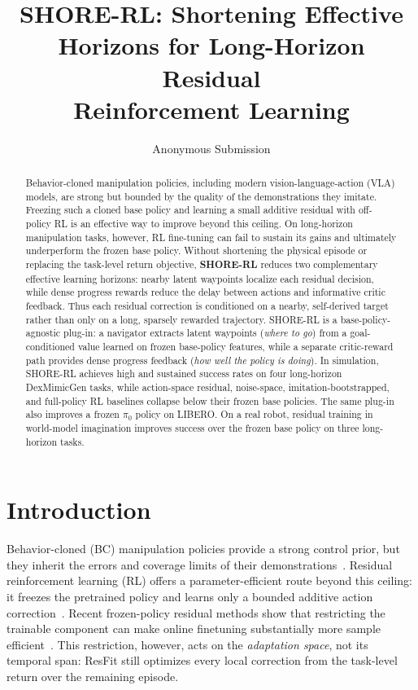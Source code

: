 \documentclass[letterpaper]{article} %
\title{SHORE-RL: Shortening Effective Horizons for Long-Horizon Residual\\
Reinforcement Learning}
\author{Anonymous Submission}
\begin{document}
\maketitle

\begin{abstract}
Behavior-cloned manipulation policies, including modern vision-language-action (VLA)
models, are strong but bounded by the quality of the demonstrations they imitate. Freezing such a cloned
base policy and learning a small additive residual with off-policy RL is an effective way to
improve beyond this ceiling. On long-horizon manipulation tasks, however, RL fine-tuning can fail to sustain its gains and ultimately underperform the frozen base policy.
Without shortening the physical episode or replacing the task-level return objective, \textbf{SHORE-RL} reduces two complementary effective learning horizons: nearby latent waypoints localize each residual decision, while dense progress rewards reduce the delay between actions and informative critic feedback. Thus each residual
correction is conditioned on a nearby, self-derived target rather than only on
a long, sparsely rewarded trajectory. SHORE-RL is a base-policy-agnostic
plug-in: a navigator extracts latent waypoints (\emph{where to go}) from a
goal-conditioned value learned on frozen base-policy features, while a separate critic-reward path
provides dense progress feedback (\emph{how well the policy is doing}). In
simulation, SHORE-RL achieves high and sustained success rates on four
long-horizon DexMimicGen tasks, while action-space residual, noise-space,
imitation-bootstrapped, and full-policy RL baselines collapse below their
frozen base policies. The same plug-in also improves a frozen $\pi_0$ policy
on LIBERO. On a real robot, residual training in world-model imagination
improves success over the frozen base policy on three long-horizon tasks.
\end{abstract}

\section{Introduction}
Behavior-cloned (BC) manipulation policies provide a strong control prior, but they
inherit the errors and coverage limits of their demonstrations~\cite{ross2011dagger,mandlekar2021matters}. Residual
reinforcement learning (RL) offers a parameter-efficient route beyond this ceiling:
it freezes the pretrained policy and learns only a bounded additive action
correction~\cite{johannink2019residual}. Recent frozen-policy residual methods show
that restricting the trainable component can make online finetuning substantially
more sample efficient~\cite{resfit2025residual}. This restriction,
however, acts on the \emph{adaptation space}, not its temporal span: ResFit
still optimizes every local correction from the task-level return over the remaining
episode.
\end{document}
